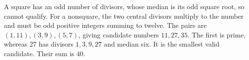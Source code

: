 A square has an odd number of divisors, whose median is its odd square root, so cannot qualify. For a nonsquare, the two central divisors multiply to the number and must be odd positive integers summing to twelve. The pairs are $(1,11),(3,9),(5,7)$, giving candidate numbers $11,27,35$. The first is prime, whereas 27 has divisors $1,3,9,27$ and median six. It is the smallest valid candidate. Their sum is $\boxed{40}$.

